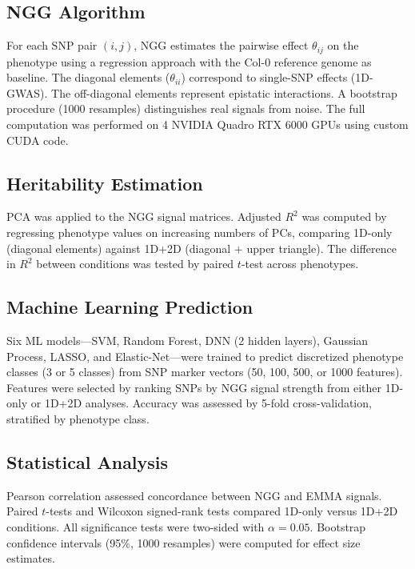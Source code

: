 \documentclass[11pt]{article}
\begin{document}
\subsection{NGG Algorithm}

For each SNP pair $(i, j)$, NGG estimates the pairwise effect $\theta_{ij}$ on the phenotype using a regression approach with the Col-0 reference genome as baseline. The diagonal elements ($\theta_{ii}$) correspond to single-SNP effects (1D-GWAS). The off-diagonal elements represent epistatic interactions. A bootstrap procedure (1000 resamples) distinguishes real signals from noise. The full computation was performed on 4 NVIDIA Quadro RTX 6000 GPUs using custom CUDA code.

\subsection{Heritability Estimation}

PCA was applied to the NGG signal matrices. Adjusted $R^2$ was computed by regressing phenotype values on increasing numbers of PCs, comparing 1D-only (diagonal elements) against 1D+2D (diagonal + upper triangle). The difference in $R^2$ between conditions was tested by paired $t$-test across phenotypes.

\subsection{Machine Learning Prediction}

Six ML models---SVM, Random Forest, DNN (2 hidden layers), Gaussian Process, LASSO, and Elastic-Net---were trained to predict discretized phenotype classes (3 or 5 classes) from SNP marker vectors (50, 100, 500, or 1000 features). Features were selected by ranking SNPs by NGG signal strength from either 1D-only or 1D+2D analyses. Accuracy was assessed by 5-fold cross-validation, stratified by phenotype class.

\subsection{Statistical Analysis}

Pearson correlation assessed concordance between NGG and EMMA signals. Paired $t$-tests and Wilcoxon signed-rank tests compared 1D-only versus 1D+2D conditions. All significance tests were two-sided with $\alpha = 0.05$. Bootstrap confidence intervals (95\%, 1000 resamples) were computed for effect size estimates.
\end{document}
